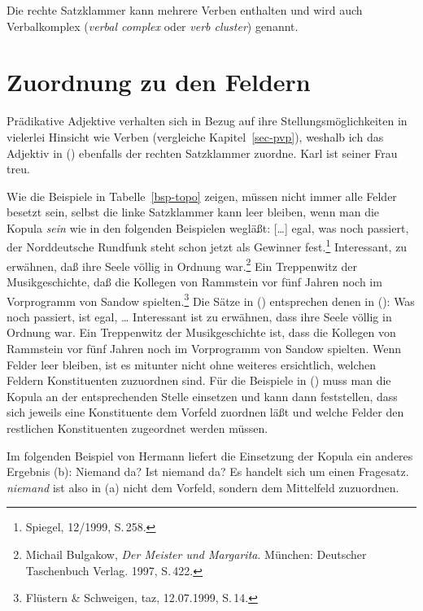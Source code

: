 Die rechte Satzklammer kann mehrere Verben enthalten und wird auch 
Verbalkomplex (\emph{verbal complex} oder \emph{verb cluster}) genannt.

\section{Zuordnung zu den Feldern}

Prädikative Adjektive verhalten sich in Bezug auf ihre Stellungsmöglichkeiten in vielerlei Hinsicht
wie Verben (vergleiche Kapitel~\ref{sec-pvp}), weshalb ich das Adjektiv in () ebenfalls der
rechten Satzklammer zuordne.
\ea
Karl ist seiner Frau treu.
\z

\noindent
Wie die Beispiele in Tabelle~\ref{bsp-topo} zeigen, müssen nicht immer
alle Felder besetzt sein, selbst die linke Satzklammer kann leer bleiben,
wenn man die Kopula \emph{sein} wie in den folgenden Beispielen wegläßt:
\eal
\ex
{}[\ldots]
egal,      was  noch  passiert, der Norddeutsche Rundfunk             steht  schon   jetzt als Gewinner fest.\footnote{
        Spiegel, 12/1999, S.\,258.
}
\ex Interessant, zu erwähnen, daß ihre Seele völlig    in Ordnung war.\footnote{
        Michail Bulgakow, \emph{Der Meister und Margarita}. München: Deutscher Taschenbuch Verlag. 1997, S.\,422.
      }
\ex
Ein Treppenwitz der    Musikgeschichte, daß die Kollegen   von Rammstein vor    fünf Jahren noch im      Vorprogramm   von Sandow spielten.\footnote{
         Flüstern \& Schweigen, taz, 12.07.1999, S.\,14. %
}
\zl
Die Sätze in () entsprechen denen in ():
\eal
\ex 
Was noch passiert, ist egal, \ldots
\ex
Interessant ist zu erwähnen, dass ihre Seele völlig in Ordnung war.
\ex 
Ein Treppenwitz der Musikgeschichte ist, dass die Kollegen von Rammstein vor fünf Jahren noch im Vorprogramm von Sandow spielten.
\zl
Wenn Felder leer bleiben, ist es mitunter nicht ohne weiteres
ersichtlich, welchen Feldern Konstituenten zuzuordnen sind.
Für die Beispiele in () muss man die Kopula an der entsprechenden Stelle einsetzen und kann
dann feststellen, dass sich jeweils eine Konstituente dem Vorfeld zuordnen läßt und welche Felder
den restlichen Konstituenten zugeordnet werden müssen.

Im folgenden Beispiel von Hermann \citet[]{Paul1919a} liefert die Einsetzung der Kopula
ein anderes Ergebnis (b):
\eal
\ex Niemand da?
\ex Ist niemand da?
\zl
Es handelt sich um einen Fragesatz. \emph{niemand} ist also in (a)
nicht dem Vorfeld, sondern dem Mittelfeld zuzuordnen.

